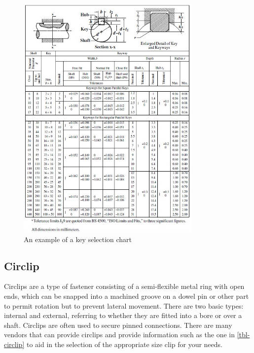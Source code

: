 \begin{figure}[h!]
  \centering
  \includegraphics[width=0.8\textwidth]{figs/key-selection.jpg}
  \caption{An example of a key selection chart}
\end{figure}

\subsection{Circlip}

Circlips are a type of fastener consisting of a semi-flexible metal ring with open ends, which can be snapped into a machined groove on a dowel pin or other part to permit rotation but to prevent lateral movement. 
There are two basic types: internal and external, referring to whether they are fitted into a bore or over a shaft.
Circlips are often used to secure pinned connections.
There are many vendors that can provide circlips and provide information such as the one in \cref{tbl-circlip} to aid in the selection of the appropriate size clip for your needs.

